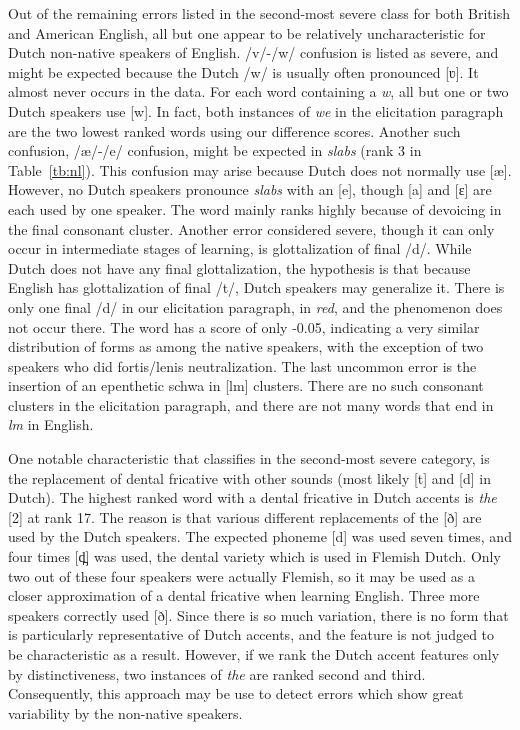 \documentclass[output=paper]{LSP/langsci}
\begin{document}
Out of the remaining errors listed in the second-most severe class for both British and American English, all but one appear to be relatively uncharacteristic for Dutch non-native speakers of English. /v/-/w/ confusion is listed as severe, and might be expected because the Dutch /w/ is usually often pronounced 
[ʋ]. It almost never occurs in the data. For each word containing a \textit{w}, all but one or two Dutch speakers use [w]. In fact, both instances of \textit{we} in the elicitation paragraph are the two lowest ranked words using our difference scores. Another such confusion, /æ/-/e/ confusion, might be expected in \textit{slabs} (rank 3 in Table~\ref{tb:nl}). This confusion may arise because Dutch does not normally use [æ]. However, no Dutch speakers pronounce \textit{slabs} with an [e], though [a] and [ɛ] are each used by one speaker. The word mainly ranks highly because of devoicing in the final consonant cluster. Another error considered severe, though it can only occur in intermediate stages of learning, is glottalization of final /d/. While Dutch does not have any final glottalization, the hypothesis is that because English has glottalization of final /t/, Dutch speakers may generalize it. There is only one final /d/ in our elicitation paragraph, in \textit{red}, and the phenomenon does not occur there. The word has a score of only -0.05, indicating a very similar distribution of forms as among the native speakers, with the exception of two speakers who did fortis/lenis neutralization. The last uncommon error is the insertion of an epenthetic schwa in [lm] clusters. There are no such consonant clusters in the elicitation paragraph, and there are not many words that end in \textit{lm} in English.

One notable characteristic that \citet{van_den_doel_evaluation_2006} classifies in the second-most severe category, is the replacement of dental fricative with other sounds (most likely [t] and [d] in Dutch). The highest ranked word with a dental fricative in Dutch accents is \textit{the }[2] at rank 17. The reason is that various different replacements of the 
[ð] are used by the Dutch speakers. The expected phoneme [d] was used seven times, and four times [d̪] was used, the dental variety which is used in Flemish Dutch. Only two out of these four speakers were actually Flemish, so it may be used as a closer approximation of a dental fricative when learning English. Three more speakers correctly used [ð].
Since there is so much variation, there is no form that is particularly representative of Dutch accents, and the feature is not judged to be characteristic as a result. However, if we rank the Dutch accent features only by distinctiveness, two instances of \textit{the} are ranked second and third. Consequently, this approach may be use to detect errors which show great variability by the non-native speakers.
\end{document}

